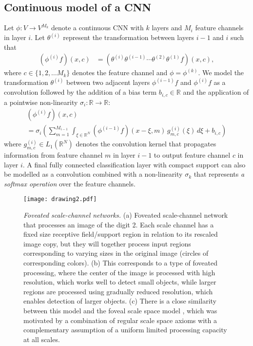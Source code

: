 \documentclass[twocolumn,runningheads]{svjour3}
\def\bbbr{{\mathbb R}}
\begin{document}
\subsection{Continuous model of a CNN}

Let $\phi:  V \to V^{M_k}$ denote a continuous CNN with $k$ layers and $M_i$ feature channels in layer $i$.
Let $\theta^{(i)}$ represent the transformation between layers $i-1$ and $i$ such that
\begin{align}
(\phi^{(i)} f)(x,c) &= (\theta^{(i)} \theta^{(i-1)} \cdots \theta^{(2)} \theta^{(1)} f)(x,c), 
\label{eq-phi_i-def}
\end{align} 
where $c \in \{1,2, \dots M_k\}$ denotes the feature channel and $\phi = \phi^{(k)}$.
We model the transformation $\theta^{(i)}$ between two adjacent layers
$\phi^{(i-1)}f$ and $\phi^{(i)}f$ as a convolution followed by the
addition of a bias term $b_{i,c} \in \bbbr$ and the application of a
pointwise non-linearity $\sigma_i:\bbbr \to \bbbr$:
\begin{multline}
(\phi^{(i)} f)(x, c)\\ =  \sigma_i \left( \sum_{m=1}^{M_{i-1}} \int_{\xi \in \bbbr^N } (\phi^{(i-1)}f)(x-\xi, m)\, g^{(i)}_{m,c}(\xi) \, d\xi + b_{i,c}
\right)
\label{eq-phi_integral}
\end{multline}
where $g^{(i)}_{m,c} \in L_1(\bbbr^N)$
denotes the convolution kernel that propagates information from
feature 
channel $m$ in layer $i-1$ to output feature channel $c$ in layer $i$.
A final fully connected classification layer with compact support can
also be modelled as a convolution combined with a non-linearity
$\sigma_k$ that represents {\em a softmax operation\/} over the
feature channels.

\begin{figure*}[hbpt]
	\begin{center}
		\texttt{[image: drawing2.pdf]} 
	\end{center}
	\caption{\emph{Foveated scale-channel networks.} (a) 
		Foveated scale-channel network that processes an image
                of the digit 2. Each scale channel has a fixed
                size receptive field/support region in relation to its rescaled image copy, but they will together process input regions
                corresponding to varying sizes in the original image
                (circles of corresponding colors).
		(b) This corresponds to a type of foveated processing,
                where the center of the image is processed with high
                resolution, which works well to detect small objects,
                while larger regions are processed using gradually
                reduced resolution, which enables detection of larger
                objects. (c) There is a close similarity between this
                model and the foveal scale space model \cite{CVAP166},
                which was motivated by a combination of regular scale
                space axioms with a complementary assumption of a
                uniform limited processing capacity at all scales.}
	\label{fig-foveated-processing}
\end{figure*}
\end{document}
